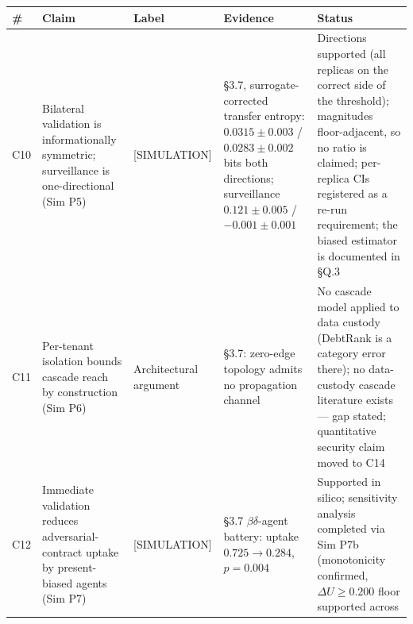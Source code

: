 \documentclass[
]{article}
\newcounter{none} %
\begin{document}
{\def\LTcaptype{none} %
\begin{longtable}[]{@{}
  >{\raggedright\arraybackslash}p{}
  >{\raggedright\arraybackslash}p{}
  >{\raggedright\arraybackslash}p{}
  >{\raggedright\arraybackslash}p{}
  >{\raggedright\arraybackslash}p{}@{}}
\toprule\noalign{}
\begin{minipage}[b]{\linewidth}\raggedright
\#
\end{minipage} & \begin{minipage}[b]{\linewidth}\raggedright
Claim
\end{minipage} & \begin{minipage}[b]{\linewidth}\raggedright
Label
\end{minipage} & \begin{minipage}[b]{\linewidth}\raggedright
Evidence
\end{minipage} & \begin{minipage}[b]{\linewidth}\raggedright
Status
\end{minipage} \\
\midrule\noalign{}
\endhead
\bottomrule\noalign{}
\endlastfoot
C10 & Bilateral validation is informationally symmetric; surveillance is
one-directional (Sim P5) & {[}SIMULATION{]} & §3.7, surrogate-corrected
transfer entropy: \(0.0315 \pm 0.003\) / \(0.0283 \pm 0.002\) bits both
directions; surveillance \(0.121 \pm 0.005\) / \(-0.001 \pm 0.001\) &
Directions supported (all replicas on the correct side of the
threshold); magnitudes floor-adjacent, so no ratio is claimed;
per-replica CIs registered as a re-run requirement; the biased estimator
is documented in §Q.3 \\
C11 & Per-tenant isolation bounds cascade reach by construction (Sim P6)
& Architectural argument & §3.7: zero-edge topology admits no
propagation channel & No cascade model applied to data custody (DebtRank
is a category error there); no data-custody cascade literature exists
--- gap stated; quantitative security claim moved to C14 \\
C12 & Immediate validation reduces adversarial-contract uptake by
present-biased agents (Sim P7) & {[}SIMULATION{]} & §3.7
\(\beta\delta\)-agent battery: uptake \(0.725 \to 0.284\), \(p = 0.004\)
& Supported in silico; sensitivity analysis completed via Sim P7b
(monotonicity confirmed, \(\Delta U \ge 0.200\) floor supported across

\end{longtable}}
\end{document}

